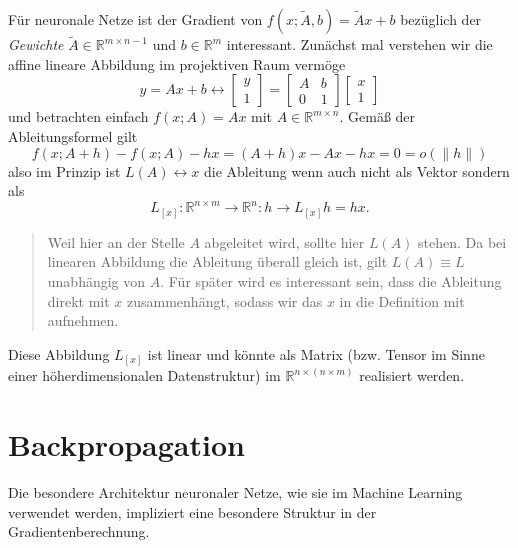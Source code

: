 \documentclass[
]{book}
\newenvironment {JHSAYS} [0] {\begin{quote}\color{jhsc}} {\end{quote}}
\theoremstyle{definition}
\theoremstyle{definition}
\theoremstyle{definition}
\theoremstyle{definition}
\theoremstyle{remark}
\begin{document}
Für neuronale Netze ist der Gradient von \(f(x; \tilde A, b)=\tilde Ax+b\) bezüglich der
\emph{Gewichte} \(\tilde A\in \mathbb R^{m\times n-1}\) und \(b\in \mathbb R^{m}\) interessant.
Zunächst mal verstehen wir die affine lineare Abbildung im
projektiven Raum vermöge
\begin{equation*}
y = Ax + b \longleftrightarrow \begin{bmatrix} y \\ 1 \end{bmatrix} = \begin{bmatrix}A & b \\ 0 & 1 \end{bmatrix}\begin{bmatrix} x \\ 1
\end{bmatrix}
\end{equation*}
und betrachten einfach \(f(x; A)=Ax\) mit \(A\in \mathbb R^{m\times n}\). Gemäß der Ableitungsformel gilt
\begin{equation*}
f(x;A+h) - f(x;A) - hx = (A+h)x - Ax - hx = 0 = o(\|h\|)
\end{equation*}
also im Prinzip ist \(L(A)\leftrightarrow x\) die Ableitung wenn auch nicht als Vektor sondern als
\begin{equation*}
L_{[x]}\colon \mathbb R^{n\times m} \to \mathbb R^{n}\colon h\to L_{[x]} h = hx.
\end{equation*}

\leavevmode\hypertarget{Lx-not-LA}{}%
\begin{JHSAYS}
Weil hier an der Stelle \(A\) abgeleitet wird, sollte hier \(L(A)\) stehen. Da bei
linearen Abbildung die Ableitung überall gleich ist, gilt \(L(A)\equiv L\)
unabhängig von \(A\). Für später wird es interessant sein, dass
die Ableitung direkt mit \(x\) zusammenhängt, sodass wir das \(x\) in die
Definition mit aufnehmen.

\end{JHSAYS}

Diese Abbildung \(L_{[x]}\) ist linear und könnte als Matrix (bzw. Tensor im Sinne
einer höherdimensionalen Datenstruktur)
im \(\mathbb R^{n \times (n\times m)}\) realisiert werden.

\hypertarget{backpropagation}{%
\section{Backpropagation}\label{backpropagation}}

Die besondere Architektur neuronaler Netze, wie sie im Machine Learning
verwendet werden, impliziert eine besondere Struktur in der
Gradientenberechnung.
\end{document}
